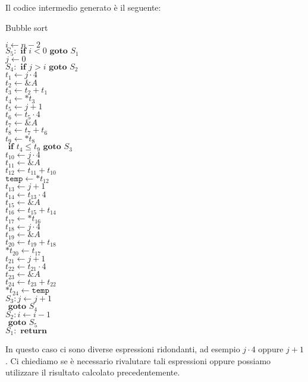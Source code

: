 Il codice intermedio generato è il seguente:


\begin{algorithm}[H]
    \caption{Bubble sort}
        $i \gets n - 2$\\
        $S_5: \textbf{ if } i < 0 \textbf{ goto } S_1$\\
        $j \gets 0$\\
        $S_4: \textbf{ if } j > i \textbf{ goto } S_2$\\
        $t_1 \gets j \cdot 4$\\
        $t_2 \gets \&A$\\
        $t_3 \gets t_2 + t_1$\\
        $t_4 \gets *t_3$\\
        $t_5 \gets j + 1$\\
        $t_6 \gets t_5 \cdot 4$\\
        $t_7 \gets \&A$\\
        $t_8 \gets t_7 + t_6$\\
        $t_9 \gets *t_8$\\
        $\textbf{ if } t_4 \leq t_9 \textbf{ goto } S_3$\\
        $t_{10} \gets j \cdot 4$\\
        $t_{11} \gets \&A$\\
        $t_{12} \gets t_{11} + t_{10}$\\
        $\texttt{temp} \gets *t_{12}$\\
        $t_{13} \gets j + 1$\\
        $t_{14} \gets t_{13} \cdot 4$\\
        $t_{15} \gets \&A$\\
        $t_{16} \gets t_{15} + t_{14}$\\
        $t_{17} \gets *t_{16}$\\
        $t_{18} \gets j \cdot 4$\\
        $t_{19} \gets \&A$\\
        $t_{20} \gets t_{19} + t_{18}$\\
        $*t_{20} \gets t_{17}$\\
        $t_{21} \gets j + 1$\\
        $t_{22} \gets t_{21} \cdot 4$\\
        $t_{23} \gets \&A$\\
        $t_{24} \gets t_{23} + t_{22}$\\
        $*t_{24} \gets \texttt{temp}$\\
        $S_3: j \gets j + 1$\\
        $\textbf{ goto } S_4$\\
        $S_2: i \gets i - 1$\\
        $\textbf{ goto } S_5$\\
        $S_1: \textbf{ return }$\\
\end{algorithm}
In questo caso ci sono diverse espressioni ridondanti, ad esempio $j \cdot 4$ oppure $j + 1$.
Ci chiediamo se è necessario rivalutare tali espressioni oppure possiamo utilizzare il risultato
calcolato precedentemente.

